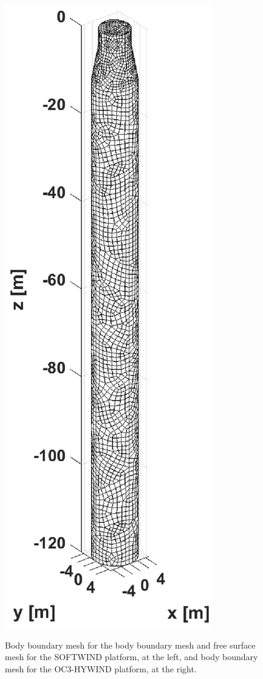 \documentclass[12pt,a4paper,titlepage]{article}
\begin{document}
\begin{figure}[ht]
{\includegraphics[scale=0.5,trim = 160mm 0mm 160mm 0mm, clip]{figures/OC3_HYWIND/bodyMesh.eps}
}
\caption{Body boundary mesh for the body boundary mesh and free surface mesh for the SOFTWIND platform, at the left, and body boundary mesh for the OC3-HYWIND platform, at the right.}\label{fig:meshesSoftwindHYWIND}
\end{figure}
\end{document}
